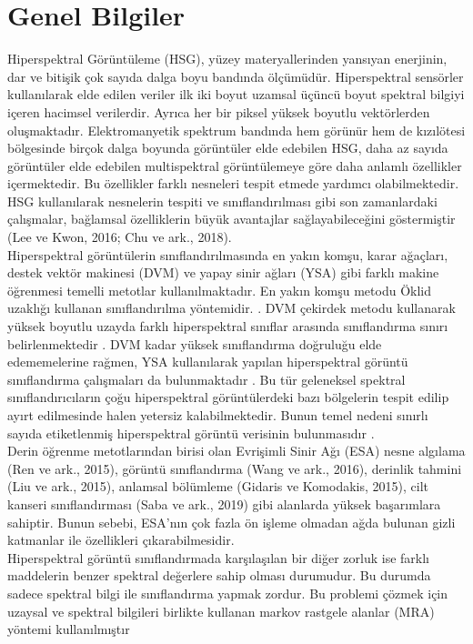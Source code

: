 \chapter{Genel Bilgiler}

Hiperspektral Görüntüleme (HSG), yüzey materyallerinden yansıyan enerjinin, dar ve bitişik çok sayıda dalga boyu bandında
ölçümüdür. Hiperspektral sensörler kullanılarak elde edilen veriler ilk iki boyut uzamsal üçüncü boyut spektral bilgiyi içeren hacimsel
verilerdir. Ayrıca her bir piksel yüksek boyutlu vektörlerden oluşmaktadır. Elektromanyetik spektrum bandında hem görünür hem de
kızılötesi bölgesinde birçok dalga boyunda görüntüler elde edebilen HSG, daha az sayıda görüntüler elde edebilen multispektral
görüntülemeye göre daha anlamlı özellikler içermektedir. Bu özellikler farklı nesneleri tespit etmede yardımcı olabilmektedir. HSG
kullanılarak nesnelerin tespiti ve sınıflandırılması gibi son zamanlardaki çalışmalar, bağlamsal özelliklerin büyük avantajlar
sağlayabileceğini göstermiştir (Lee ve Kwon, 2016; Chu ve ark., 2018).\\

Hiperspektral görüntülerin sınıflandırılmasında en yakın
komşu, karar ağaçları, destek vektör makinesi (DVM) ve
yapay sinir ağları (YSA) gibi farklı makine öğrenmesi
temelli metotlar kullanılmaktadır. En yakın komşu metodu
Öklid uzaklığı kullanan sınıflandırılma yöntemidir. \cite{blanzieri2008nearest}. DVM
çekirdek metodu kullanarak yüksek boyutlu uzayda farklı
hiperspektral sınıflar arasında sınıflandırma sınırı
belirlenmektedir \cite{melgani2004classification}. DVM kadar yüksek sınıflandırma
doğruluğu elde edememelerine rağmen, YSA kullanılarak
yapılan hiperspektral görüntü sınıflandırma çalışmaları da
bulunmaktadır \cite{ratle2010semisupervised}. Bu tür geleneksel spektral
sınıflandırıcıların çoğu hiperspektral görüntülerdeki bazı
bölgelerin tespit edilip \hfill ayırt  edilmesinde halen yetersiz
kalabilmektedir. Bunun temel nedeni sınırlı sayıda
etiketlenmiş hiperspektral görüntü verisinin bulunmasıdır
\cite{kang2014intrinsic}. \\
Derin öğrenme metotlarından birisi olan Evrişimli Sinir Ağı (ESA) nesne algılama (Ren ve ark., 2015), görüntü sınıflandırma
(Wang ve ark., 2016), derinlik tahmini (Liu ve ark., 2015), anlamsal bölümleme (Gidaris ve Komodakis, 2015), cilt kanseri
sınıflandırması (Saba ve ark., 2019) gibi alanlarda yüksek başarımlara sahiptir. Bunun sebebi, ESA’nın çok fazla ön işleme olmadan
ağda bulunan gizli katmanlar ile özellikleri çıkarabilmesidir. \\
\newpage
Hiperspektral görüntü sınıflandırmada karşılaşılan bir diğer zorluk ise farklı maddelerin benzer spektral değerlere sahip
olması durumudur. Bu durumda sadece spektral bilgi ile
sınıflandırma yapmak zordur. Bu problemi çözmek için
uzaysal ve spektral bilgileri birlikte kullanan markov rastgele
alanlar (MRA) yöntemi kullanılmıştır \cite{tarabalka2010svm} \\

